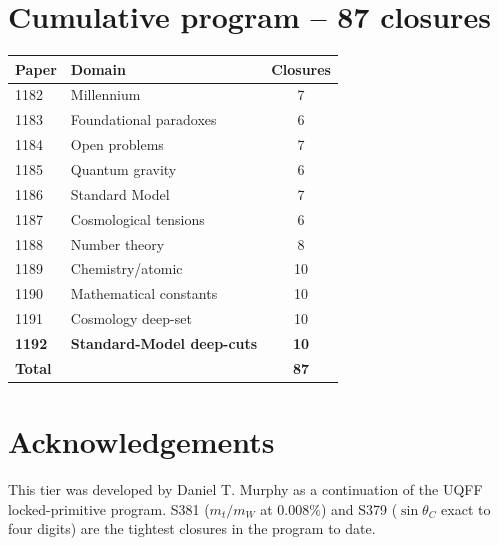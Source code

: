 \documentclass[11pt]{article}
\begin{document}
\section{Cumulative program -- 87 closures}
\begin{table}[h!]
\centering
\begin{tabular}{llc}
\toprule
Paper & Domain & Closures \\
\midrule
1182 & Millennium                  & 7 \\
1183 & Foundational paradoxes      & 6 \\
1184 & Open problems               & 7 \\
1185 & Quantum gravity             & 6 \\
1186 & Standard Model              & 7 \\
1187 & Cosmological tensions       & 6 \\
1188 & Number theory               & 8 \\
1189 & Chemistry/atomic            & 10 \\
1190 & Mathematical constants      & 10 \\
1191 & Cosmology deep-set          & 10 \\
\textbf{1192} & \textbf{Standard-Model deep-cuts} & \textbf{10} \\
\midrule
\textbf{Total} & & \textbf{87} \\
\bottomrule
\end{tabular}
\end{table}

\section*{Acknowledgements}
This tier was developed by Daniel T. Murphy as a continuation of the
UQFF locked-primitive program.  S381 ($m_t/m_W$ at $0.008\%$) and
S379 ($\sin\theta_C$ exact to four digits) are the tightest closures
in the program to date.
\end{document}
